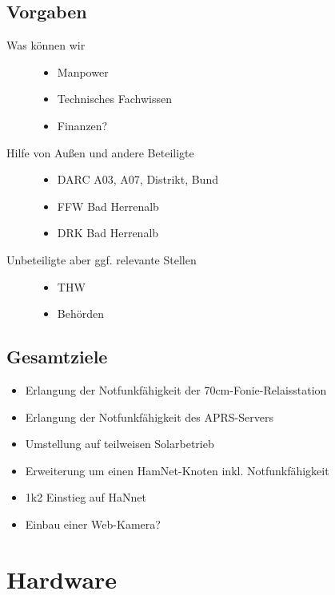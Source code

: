 \documentclass[a4paper]{scrartcl}
\begin{document}
\subsection{Vorgaben}
\begin{description}
    \item[Was k\"onnen wir]
        \begin{itemize}
            \item Manpower
            \item Technisches Fachwissen
            \item Finanzen?
        \end{itemize}
    \item[Hilfe von Au\ss{}en und andere Beteiligte]
        \begin{itemize}
            \item DARC A03, A07, Distrikt, Bund
            \item FFW Bad Herrenalb
            \item DRK Bad Herrenalb
        \end{itemize}
    \item[Unbeteiligte aber ggf. relevante Stellen]
        \begin{itemize}
            \item THW
            \item Beh\"orden
        \end{itemize}
\end{description}

\subsection{Gesamtziele}
\begin{itemize}
    \item Erlangung der Notfunkf\"ahigkeit der 70cm-Fonie-Relaisstation
    \item Erlangung der Notfunkf\"ahigkeit des APRS-Servers
    \item Umstellung auf teilweisen Solarbetrieb
    \item Erweiterung um einen HamNet-Knoten inkl. Notfunkf\"ahigkeit
    \item 1k2 Einstieg auf HaNnet
    \item Einbau einer Web-Kamera?
\end{itemize}


\section{Hardware}
\end{document}
